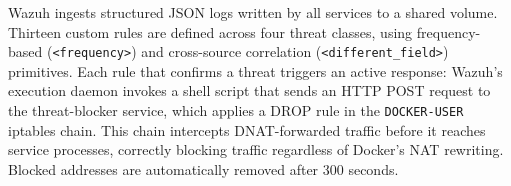 Wazuh ingests structured JSON logs written by all services to a shared volume. Thirteen
custom rules are defined across four threat classes, using frequency-based
(\texttt{<frequency>}) and cross-source correlation (\texttt{<different\_field>})
primitives. Each rule that confirms a threat triggers an active response: Wazuh's
execution daemon invokes a shell script that sends an HTTP POST request to the
threat-blocker service, which applies a DROP rule in the \texttt{DOCKER-USER}
iptables chain. This chain intercepts DNAT-forwarded traffic before it reaches service
processes, correctly blocking traffic regardless of Docker's NAT rewriting. Blocked
addresses are automatically removed after 300 seconds.
